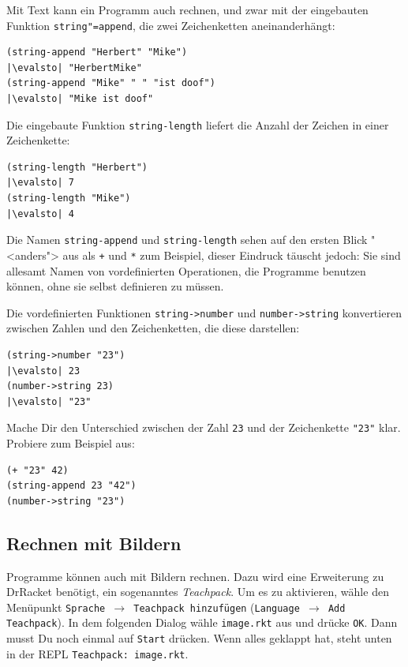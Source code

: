 Mit Text kann ein Programm auch rechnen, und zwar mit der eingebauten
Funktion
\texttt{string"=append},
die zwei Zeichenketten aneinanderhängt:
%
\begin{lstlisting}
(string-append "Herbert" "Mike")
|\evalsto| "HerbertMike"
(string-append "Mike" " " "ist doof")
|\evalsto| "Mike ist doof"
\end{lstlisting}
%
Die eingebaute Funktion
\lstinline{string-length}
liefert die Anzahl der Zeichen in einer Zeichenkette:
%
\begin{lstlisting}
(string-length "Herbert")
|\evalsto| 7
(string-length "Mike")
|\evalsto| 4
\end{lstlisting}
%
Die Namen \lstinline{string-append} und \lstinline{string-length} sehen auf
den ersten Blick "<anders"> aus als \lstinline{+} und \lstinline{*} zum
Beispiel, dieser Eindruck täuscht jedoch: Sie sind allesamt Namen von
vordefinierten Operationen, die Programme benutzen können, ohne sie
selbst definieren zu müssen.

Die vordefinierten Funktionen
\lstinline{string->number}
und \lstinline{number->string} konvertieren zwischen Zahlen und den
Zeichenketten, die diese darstellen:
%
\begin{lstlisting}
(string->number "23")
|\evalsto| 23
(number->string 23)
|\evalsto| "23"
\end{lstlisting}
%
\begin{aufgabeinline}
  Mache Dir den Unterschied zwischen der Zahl \lstinline{23} und der
  Zeichenkette \lstinline{"23"} klar.  Probiere zum Beispiel aus:
\begin{lstlisting}
(+ "23" 42)
(string-append 23 "42")
(number->string "23")
\end{lstlisting}
\end{aufgabeinline}

\subsection{Rechnen mit Bildern}
\label{sec:rechnen-mit-bildern}

Programme können auch mit Bildern rechnen.  Dazu wird eine Erweiterung
zu DrRacket benötigt, ein sogenanntes
\textit{Teachpack}.  Um es zu aktivieren, wähle den Menüpunkt
\texttt{Sprache $\rightarrow$ Teachpack hinzufügen}
(\texttt{Language $\rightarrow$ Add Teachpack}).  In dem folgenden Dialog
wähle \texttt{image.rkt} aus und drücke 
\texttt{OK}.  Dann musst Du noch einmal auf \texttt{Start} drücken.
Wenn alles geklappt hat, steht unten in der REPL
\texttt{Teachpack: image.rkt}.

